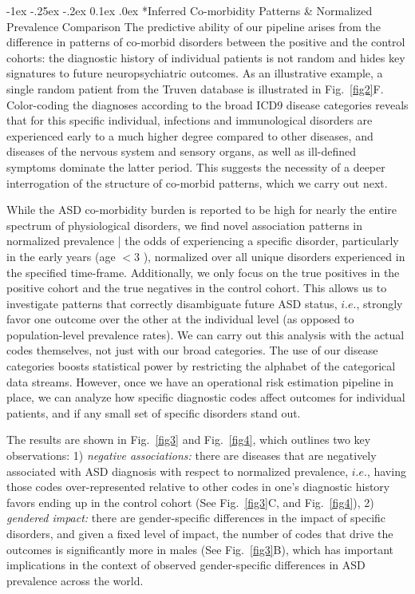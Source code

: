 \documentclass[onecolumn,,10pt]{IEEEtran}
\makeatletter
\renewcommand\subsection{\@startsection {section}{1}{\z@}%
  {-1ex \@plus -.25ex \@minus -.2ex}%
  {0.1ex \@plus.0ex}%
  {\fontsize{11}{12}\selectfont\bfseries\sffamily\color{DodgerBlue4}}}
\def\treatment{positive\xspace}
\makeatother
\begin{document}
\subsection*{Inferred Co-morbidity Patterns \& Normalized Prevalence Comparison}
The predictive ability of our pipeline arises from the difference in patterns of co-morbid disorders between the \treatment and the control cohorts: the diagnostic history of individual patients is not random and hides key signatures to future neuropsychiatric outcomes. As an illustrative example, a single random patient from the Truven database is illustrated in Fig.~\ref{fig2}F. Color-coding the diagnoses according to the broad ICD9 disease categories reveals that for this specific individual, infections and immunological disorders are experienced early to a much higher degree compared to other diseases, and diseases of the nervous system and sensory organs, as well as ill-defined symptoms dominate the latter period. This suggests the necessity of a deeper interrogation of the structure of co-morbid patterns, which we carry out next.

While the ASD co-morbidity burden  is reported to be high for nearly the entire spectrum of  physiological disorders, we find novel association patterns in normalized prevalence | the odds of experiencing a specific disorder, particularly in the early years (age $<3$ ), normalized over all unique disorders experienced in the specified time-frame. Additionally, we only focus on  the true positives in the \treatment cohort and the true negatives in the control cohort. This  allows us to investigate  patterns that correctly disambiguate future ASD status, $i.e.$, strongly favor one outcome over the other at the individual level (as opposed to population-level prevalence rates). We can carry out this analysis with the actual codes themselves, not just with our broad categories. The use of our   disease  categories boosts statistical power by restricting the alphabet of the
categorical data streams. However, once we have an operational risk estimation pipeline in place, we can analyze how specific diagnostic codes affect outcomes for individual patients, and if any small set of specific disorders stand out.

The results are shown in Fig.~\ref{fig3} and Fig.~\ref{fig4}, which outlines two key  observations: 1) \textit{negative associations:} there are diseases that are negatively associated with ASD diagnosis with respect to normalized prevalence, $i.e.$, having those codes over-represented relative to other codes in one's diagnostic history favors ending up in the control cohort (See Fig.~\ref{fig3}C, and Fig.~\ref{fig4}), 2) \textit{gendered impact:} there are gender-specific differences in the impact of specific disorders,  and given a fixed level of impact, the number of codes that drive the outcomes is significantly more in males (See Fig.~\ref{fig3}B), which has important implications in the context of observed  gender-specific differences in ASD prevalence across the world.
%
\end{document}
